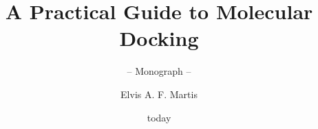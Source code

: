 \documentclass[graybox,envcountchap,sectrefs]{svmono}
\date{today}
\begin{document}
\author{Elvis A. F. Martis}
\title{A Practical Guide to Molecular Docking}
\subtitle{-- Monograph --}
\maketitle

\frontmatter%







\tableofcontents




\mainmatter%


%
%
%
%
%
%
%
%
%
%
%
%
%
%
%






\backmatter%

%
\printindex

\end{document}
